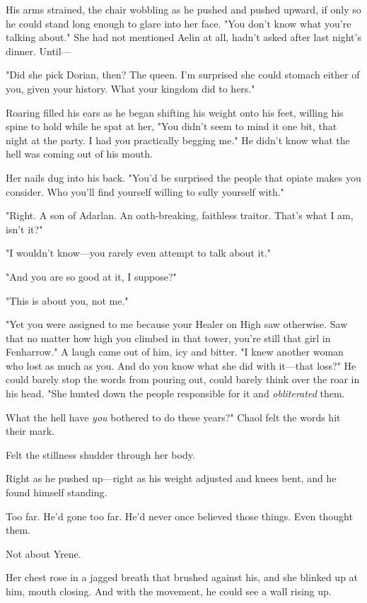 His arms strained, the chair wobbling as he pushed and pushed upward, if only so he could stand long enough to glare into her face. "You don't know what you're talking about." She had not mentioned Aelin at all, hadn't asked after last night's dinner. Until---

"Did she pick Dorian, then? The queen. I'm surprised she could stomach either of you, given your history. What your kingdom did to hers."

Roaring filled his ears as he began shifting his weight onto his feet, willing his spine to hold while he spat at her, "You didn't seem to mind it one bit, that night at the party. I had you practically begging me." He didn't know what the hell was coming out of his mouth.

Her nails dug into his back. "You'd be surprised the people that opiate makes you consider. Who you'll find yourself willing to sully yourself with."

"Right. A son of Adarlan. An oath-breaking, faithless traitor. That's what I am, isn't it?"

"I wouldn't know---you rarely even attempt to talk about it."

"And you are so good at it, I suppose?"

"This is about you, not me."

"Yet you were assigned to me because your Healer on High saw otherwise. Saw that no matter how high you climbed in that tower, you're still that girl in Fenharrow." A laugh came out of him, icy and bitter. "I knew another woman who lost as much as you. And do you know what she did with it---that loss?" He could barely stop the words from pouring out, could barely think over the roar in his head. "She hunted down the people responsible for it and \emph{obliterated} them.

What the hell have \emph{you} bothered to do these years?" Chaol felt the words hit their mark.

Felt the stillness shudder through her body.

Right as he pushed up---right as his weight adjusted and knees bent, and he found himself standing.

Too far. He'd gone too far. He'd never once believed those things. Even thought them.

Not about Yrene.

Her chest rose in a jagged breath that brushed against his, and she blinked up at him, mouth closing. And with the movement, he could see a wall rising up.

